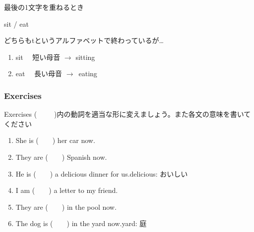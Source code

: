 \documentclass[aspectratio=169,xcolor={dvipsnames,table}]{beamer}
\newcommand{\myaudio}[1]{\href{#1}{\faVolumeUp}}
\begin{document}
\begin{frame}[plain]{最後の1文字を重ねるとき}
 \LARGE

sit / eat

 どちらもtというアルファベットで終わっているが\ldots

\bigskip

\begin{enumerate}
 \item sit\,\,\,\,\,\,  短い母音 $\longrightarrow$ sitting
 \item eat\,\,\, \, 長い母音 $\longrightarrow$\, eating
\end{enumerate}

\bigskip

\hfill{}%
\end{frame}

\subsubsection{Exercises}
\begin{frame}[plain]{Exercises}
(~~~~~)内の動詞を適当な形に変えましょう。また各文の意味を書いてください
\begin{enumerate}
 \item She is (~~~~) her car now.
 \item They are (~~~~) Spanish now. 
 \item He is  (~~~~) a delicious dinner for us.\hfill{\small delicious: おいしい}
 \item I am (~~~~) a letter to my friend.
 \item They are (~~~~) in the pool now.
 \item The dog is (~~~~) in the yard now.\hfill{\small yard: 庭}
\end{enumerate} 


\pause

\mbox{}\hfill\myaudio{./audio/021_is_ing_intro_04.mp3}
\end{frame}
\end{document}
